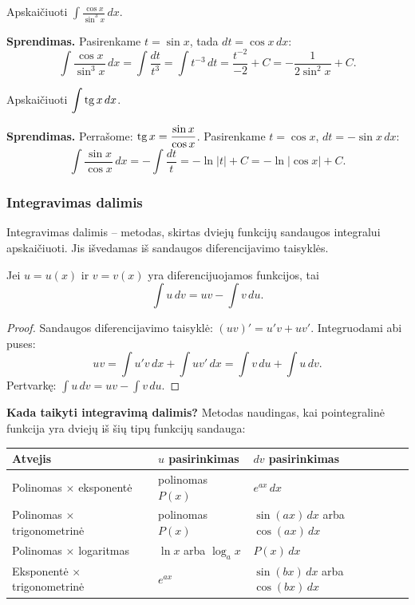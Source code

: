\begin{example}
Apskaičiuoti $\displaystyle\int \frac{\cos x}{\sin^3 x}\,dx$.

\textbf{Sprendimas.} Pasirenkame $t=\sin x$, tada $dt=\cos x\,dx$:
\[
\int\frac{\cos x}{\sin^3 x}\,dx = \int\frac{dt}{t^3}=\int t^{-3}\,dt = \frac{t^{-2}}{-2}+C = -\frac{1}{2\sin^2 x}+C.
\]
\end{example}

\begin{example}
Apskaičiuoti $\displaystyle\int \operatorname{tg} x\,dx$.

\textbf{Sprendimas.} Perrašome: $\operatorname{tg} x = \dfrac{\sin x}{\cos x}$. Pasirenkame $t=\cos x$, $dt=-\sin x\,dx$:
\[
\int\frac{\sin x}{\cos x}\,dx = -\int\frac{dt}{t} = -\ln|t|+C = -\ln|\cos x|+C.
\]
\end{example}

\subsubsection{Integravimas dalimis}

Integravimas dalimis – metodas, skirtas dviejų funkcijų sandaugos integralui apskaičiuoti. Jis išvedamas iš sandaugos diferencijavimo taisyklės.

\begin{theorem}
Jei $u=u(x)$ ir $v=v(x)$ yra diferencijuojamos funkcijos, tai
\[
\boxed{\int u\,dv = uv - \int v\,du.}
\]
\end{theorem}

\begin{proof}
Sandaugos diferencijavimo taisyklė: $(uv)' = u'v+uv'$. Integruodami abi puses:
\[
uv = \int u'v\,dx + \int uv'\,dx = \int v\,du + \int u\,dv.
\]
Pertvarkę: $\int u\,dv = uv - \int v\,du$.
\end{proof}

\textbf{Kada taikyti integravimą dalimis?} Metodas naudingas, kai pointegralinė funkcija yra dviejų iš šių tipų funkcijų sandauga:

\begin{center}
\renewcommand{\arraystretch}{1.5}
\begin{tabular}{|l|l|l|}
\hline
\textbf{Atvejis} & \textbf{$u$ pasirinkimas} & \textbf{$dv$ pasirinkimas} \\
\hline
Polinomas $\times$ eksponentė & polinomas $P(x)$ & $e^{ax}\,dx$ \\
Polinomas $\times$ trigonometrinė & polinomas $P(x)$ & $\sin(ax)\,dx$ arba $\cos(ax)\,dx$ \\
Polinomas $\times$ logaritmas & $\ln x$ arba $\log_a x$ & $P(x)\,dx$ \\
Eksponentė $\times$ trigonometrinė & $e^{ax}$ & $\sin(bx)\,dx$ arba $\cos(bx)\,dx$ \\
\hline
\end{tabular}
\end{center}

